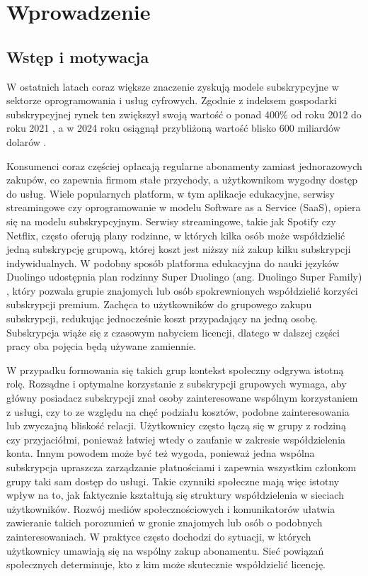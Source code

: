 \chapter{Wprowadzenie}\label{chap:introduction}
\section{Wstęp i motywacja}
W ostatnich latach coraz większe znaczenie zyskują modele subskrypcyjne w sektorze oprogramowania i usług cyfrowych. Zgodnie z indeksem gospodarki subskrypcyjnej rynek ten zwiększył swoją wartość o ponad 400\% od roku 2012 do roku 2021 \cite{subscriptionEconomyIndex}, a w 2024 roku osiągnął przybliżoną wartość blisko 600 miliardów dolarów \cite{subscriptionEconomyPrice2024}.

Konsumenci coraz częściej opłacają regularne abonamenty zamiast jednorazowych zakupów, co zapewnia firmom stałe przychody, a użytkownikom wygodny dostęp do usług. Wiele popularnych platform, w tym aplikacje edukacyjne, serwisy streamingowe czy oprogramowanie w modelu Software as a Service (SaaS), opiera się na modelu subskrypcyjnym. Serwisy streamingowe, takie jak Spotify czy Netflix, często oferują plany rodzinne, w których kilka osób może współdzielić jedną subskrypcję grupową, której koszt jest niższy niż zakup kilku subskrypcji indywidualnych. W podobny sposób platforma edukacyjna do nauki języków Duolingo udostępnia plan rodzinny Super Duolingo (ang. Duolingo Super Family) \cite{duolingo_family}, który pozwala grupie znajomych lub osób spokrewnionych współdzielić korzyści subskrypcji premium. Zachęca to użytkowników do grupowego zakupu subskrypcji, redukując jednocześnie koszt przypadający na jedną osobę. Subskrypcja wiąże się z czasowym nabyciem licencji, dlatego w dalszej części pracy oba pojęcia będą używane zamiennie.

W przypadku formowania się takich grup kontekst społeczny odgrywa istotną rolę. Rozsądne i optymalne korzystanie z subskrypcji grupowych wymaga, aby główny posiadacz subskrypcji znał osoby zainteresowane wspólnym korzystaniem z usługi, czy to ze względu na chęć podziału kosztów, podobne zainteresowania lub zwyczajną bliskość relacji. Użytkownicy często łączą się w grupy z rodziną czy przyjaciółmi, ponieważ łatwiej wtedy o zaufanie w zakresie współdzielenia konta. Innym powodem może być też wygoda, ponieważ jedna wspólna subskrypcja upraszcza zarządzanie płatnościami i zapewnia wszystkim członkom grupy taki sam dostęp do usługi. Takie czynniki społeczne mają więc istotny wpływ na to, jak faktycznie kształtują się struktury współdzielenia w sieciach użytkowników. Rozwój mediów społecznościowych i komunikatorów ułatwia zawieranie takich porozumień w gronie znajomych lub osób o podobnych zainteresowaniach. W praktyce często dochodzi do sytuacji, w których użytkownicy umawiają się na wspólny zakup abonamentu. Sieć powiązań społecznych determinuje, kto z kim może skutecznie współdzielić licencję.

